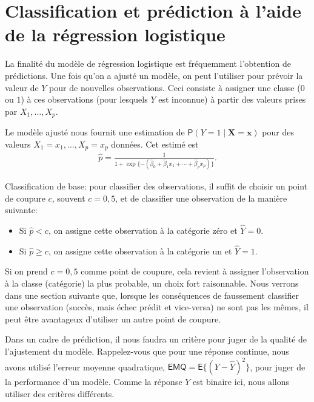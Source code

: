 \documentclass[
  11pt,
  letterpaper,
]{book}
\providecommand{\tightlist}{%
  \setlength{\itemsep}{0pt}\setlength{\parskip}{0pt}}
\theoremstyle{definition}
\theoremstyle{definition}
\theoremstyle{definition}
\theoremstyle{remark}
\begin{document}
\hypertarget{classification-et-pruxe9diction-uxe0-laide-de-la-ruxe9gression-logistique}{%
\section{Classification et prédiction à l'aide de la régression logistique}\label{classification-et-pruxe9diction-uxe0-laide-de-la-ruxe9gression-logistique}}

La finalité du modèle de régression logistique est fréquemment l'obtention de prédictions. Une fois qu'on a ajusté un modèle, on peut l'utiliser pour prévoir la valeur de \(Y\) pour de nouvelles observations. Ceci consiste à assigner une classe (\(0\) ou \(1\)) à ces observations (pour lesquels \(Y\) est inconnue) à partir des valeurs prises par \(X_1, \ldots, X_p\).

Le modèle ajusté nous fournit une estimation de \({\mathsf P}\left(Y=1 \mid \boldsymbol{X}=\boldsymbol{x}\right)\) pour des valeurs \(X_1=x_1, \ldots, X_p=x_p\) données. Cet estimé est
\begin{align*}
 \widehat{p} = \frac{1}{1+ \exp\{- ( \widehat{\beta}_0 + \widehat{\beta}_1x_1 + \cdots + \widehat{\beta}_p x_p)\}}.
\end{align*}

Classification de base: pour classifier des observations, il suffit de choisir un point de coupure \(c\), souvent \(c=0,5\), et de classifier une observation de la manière suivante:

\begin{itemize}
\tightlist
\item
  Si \(\widehat{p} < c\), on assigne cette observation à la catégorie zéro et \(\widehat{Y}=0\).
\item
  Si \(\widehat{p} \geq c\), on assigne cette observation à la catégorie un et \(\widehat{Y}=1\).
\end{itemize}

Si on prend \(c=0,5\) comme point de coupure, cela revient à assigner l'observation à la classe (catégorie) la plus probable, un choix fort raisonnable. Nous verrons dans une section suivante que, lorsque les conséquences de faussement classifier une observation (succès, mais échec prédit et vice-versa) ne sont pas les mêmes, il peut être avantageux d'utiliser un autre point de coupure.

Dans un cadre de prédiction, il nous faudra un critère pour juger de la qualité de l'ajustement du modèle.
Rappelez-vous que pour une réponse continue, nous avons utilisé l'erreur moyenne quadratique,
\(\mathsf{EMQ} = \mathsf{E}\{(Y-\widehat{Y})^2\}\),
pour juger de la performance d'un modèle. Comme la réponse \(Y\) est binaire ici, nous allons utiliser des critères différents.
\end{document}

